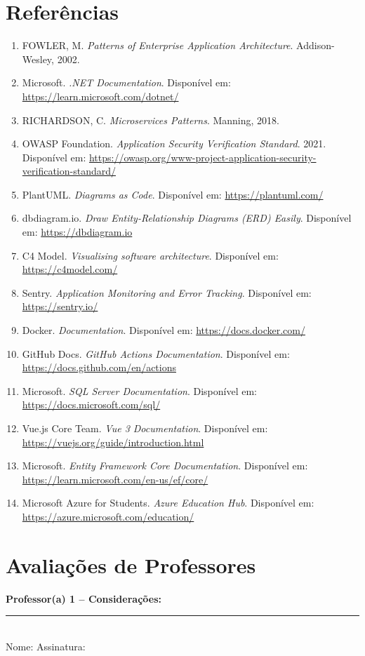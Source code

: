 \documentclass[a4paper,12pt]{article}
\begin{document}
\section{Referências}
\begin{enumerate}[nosep]
  \item FOWLER, M. \emph{Patterns of Enterprise Application Architecture}. Addison-Wesley, 2002.
  \item Microsoft. \emph{.NET Documentation}. Disponível em: \url{https://learn.microsoft.com/dotnet/}
  \item RICHARDSON, C. \emph{Microservices Patterns}. Manning, 2018.
  \item OWASP Foundation. \emph{Application Security Verification Standard}. 2021. Disponível em: \url{https://owasp.org/www-project-application-security-verification-standard/}
  \item PlantUML. \emph{Diagrams as Code}. Disponível em: \url{https://plantuml.com/}
  \item dbdiagram.io. \emph{Draw Entity-Relationship Diagrams (ERD) Easily}. Disponível em: \url{https://dbdiagram.io}
  \item C4 Model. \emph{Visualising software architecture}. Disponível em: \url{https://c4model.com/}
  \item Sentry. \emph{Application Monitoring and Error Tracking}. Disponível em: \url{https://sentry.io/}
  \item Docker. \emph{Documentation}. Disponível em: \url{https://docs.docker.com/}
  \item GitHub Docs. \emph{GitHub Actions Documentation}. Disponível em: \url{https://docs.github.com/en/actions}
  \item Microsoft. \emph{SQL Server Documentation}. Disponível em: \url{https://docs.microsoft.com/sql/}
  \item Vue.js Core Team. \emph{Vue 3 Documentation}. Disponível em: \url{https://vuejs.org/guide/introduction.html}
  \item Microsoft. \emph{Entity Framework Core Documentation}. Disponível em: \url{https://learn.microsoft.com/en-us/ef/core/}
  \item Microsoft Azure for Students. \emph{Azure Education Hub}. Disponível em: \url{https://azure.microsoft.com/education/}
\end{enumerate}

\newpage
\section*{Avaliações de Professores}
\noindent\textbf{Professor(a) 1 – Considerações:}\\[3cm]
\noindent\rule{\linewidth}{0.5pt}\\
\noindent Nome: \hfill Assinatura: \hspace{4cm}
\end{document}
